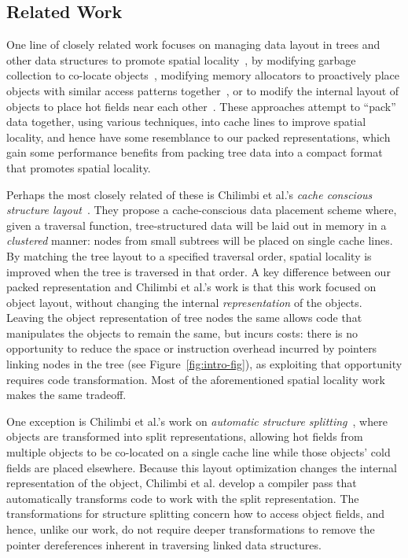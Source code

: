 \documentclass[a4paper,english]{lipics-v2016}
\begin{document}
\subsection{Related Work}


One line of closely related work focuses on managing data layout in trees and
other data structures to promote spatial
locality~\cite{Chilimbi1999,Chilimbi1999b,Truong1998,Lattner2005,Chilimbi1999a},
by modifying garbage collection to co-locate objects~\cite{Chilimbi1999a},
modifying memory allocators to proactively place objects with similar access
patterns together~\cite{Lattner2005,Chilimbi1999}, or to modify the internal
layout of objects to place hot fields near each other~\cite{Chilimbi1999b}.
These approaches attempt to ``pack'' data together, using various techniques,
into cache lines to improve spatial locality, and hence have some resemblance
to our packed representations, which gain some performance benefits from
packing tree data into a compact format that promotes spatial locality.

Perhaps the most closely related of these is Chilimbi et al.'s {\em cache
conscious structure layout}~\cite{Chilimbi1999}. They propose a
cache-conscious data placement scheme where, given a traversal function,
tree-structured data will be laid out in memory in a {\em clustered} manner:
nodes from small subtrees will be placed on single cache lines. By matching
the tree layout to a specified traversal order, spatial locality is improved
when the tree is traversed in that order. A key difference between our packed
representation and Chilimbi et al.'s work is that this work focused on object
layout, without changing the internal {\em representation} of the objects.
Leaving the object representation of tree nodes the same allows code that
manipulates the objects to remain the same, but incurs costs: there is no
opportunity to reduce the space or instruction overhead incurred by pointers
linking nodes in the tree (see Figure~\ref{fig:intro-fig}), as exploiting that
opportunity requires code transformation. Most of the aforementioned spatial
locality work makes the same tradeoff.

One exception is Chilimbi et al.'s work on {\em automatic structure
splitting}~\cite{Chilimbi1999b}, where objects are transformed into split
representations, allowing hot fields from multiple objects to be co-located on
a single cache line while those objects' cold fields are placed elsewhere.
Because this layout optimization changes the internal representation of the
object, Chilimbi et al. develop a compiler pass that automatically transforms
code to work with the split representation. The transformations for structure
splitting concern how to access object fields, and hence, unlike our work, do
not require deeper transformations to remove the pointer dereferences inherent
in traversing linked data structures.
\end{document}

